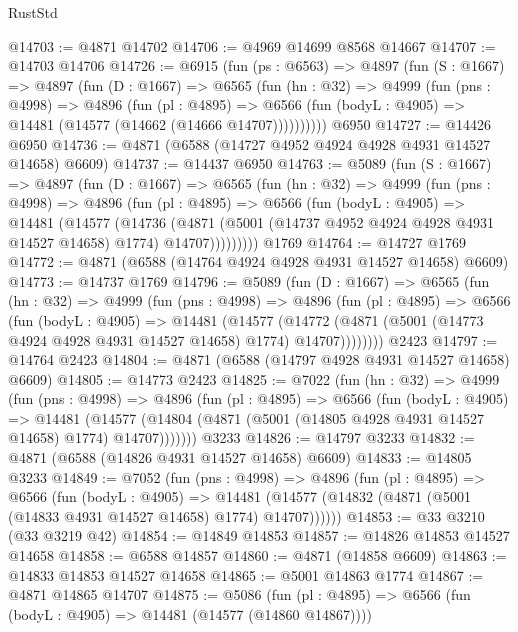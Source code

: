 \begin{lexlean}{RustStd}
\begin{coremodule}
{\begin{coremodule}
{{{{{{{{{{{{{{{{{{{{{{{{{{{{{@14703 := @4871 @14702
@14706 := @4969 @14699 @8568 @14667
@14707 := @14703 @14706
@14726 := @6915
    (fun (ps : @6563) =>
    @4897
      (fun (S : @1667) =>
      @4897
        (fun (D : @1667) =>
        @6565
          (fun (hn : @32) =>
          @4999
            (fun (pns : @4998) =>
            @4896
              (fun (pl : @4895) =>
              @6566 (fun (bodyL : @4905) => @14481 (@14577 (@14662 (@14666 @14707))))))))))
    @6950
@14727 := @14426 @6950
@14736 := @4871 (@6588 (@14727 @4952 @4924 @4928 @4931 @14527 @14658) @6609)
@14737 := @14437 @6950
@14763 := @5089
    (fun (S : @1667) =>
    @4897
      (fun (D : @1667) =>
      @6565
        (fun (hn : @32) =>
        @4999
          (fun (pns : @4998) =>
          @4896
            (fun (pl : @4895) =>
            @6566
              (fun (bodyL : @4905) =>
              @14481
                (@14577
                  (@14736
                    (@4871
                      (@5001 (@14737 @4952 @4924 @4928 @4931 @14527 @14658) @1774)
                      @14707)))))))))
    @1769
@14764 := @14727 @1769
@14772 := @4871 (@6588 (@14764 @4924 @4928 @4931 @14527 @14658) @6609)
@14773 := @14737 @1769
@14796 := @5089
    (fun (D : @1667) =>
    @6565
      (fun (hn : @32) =>
      @4999
        (fun (pns : @4998) =>
        @4896
          (fun (pl : @4895) =>
          @6566
            (fun (bodyL : @4905) =>
            @14481
              (@14577
                (@14772 (@4871 (@5001 (@14773 @4924 @4928 @4931 @14527 @14658) @1774) @14707))))))))
    @2423
@14797 := @14764 @2423
@14804 := @4871 (@6588 (@14797 @4928 @4931 @14527 @14658) @6609)
@14805 := @14773 @2423
@14825 := @7022
    (fun (hn : @32) =>
    @4999
      (fun (pns : @4998) =>
      @4896
        (fun (pl : @4895) =>
        @6566
          (fun (bodyL : @4905) =>
          @14481
            (@14577 (@14804 (@4871 (@5001 (@14805 @4928 @4931 @14527 @14658) @1774) @14707)))))))
    @3233
@14826 := @14797 @3233
@14832 := @4871 (@6588 (@14826 @4931 @14527 @14658) @6609)
@14833 := @14805 @3233
@14849 := @7052
    (fun (pns : @4998) =>
    @4896
      (fun (pl : @4895) =>
      @6566
        (fun (bodyL : @4905) =>
        @14481 (@14577 (@14832 (@4871 (@5001 (@14833 @4931 @14527 @14658) @1774) @14707))))))
@14853 := @33 @3210 (@33 @3219 @42)
@14854 := @14849 @14853
@14857 := @14826 @14853 @14527 @14658
@14858 := @6588 @14857
@14860 := @4871 (@14858 @6609)
@14863 := @14833 @14853 @14527 @14658
@14865 := @5001 @14863 @1774
@14867 := @4871 @14865 @14707
@14875 := @5086
    (fun (pl : @4895) => @6566 (fun (bodyL : @4905) => @14481 (@14577 (@14860 @14867))))
}}}}}}}}}}}}}}}}}}}}}}}}}}}}}
\end{coremodule}}
\end{coremodule}
\end{lexlean}

